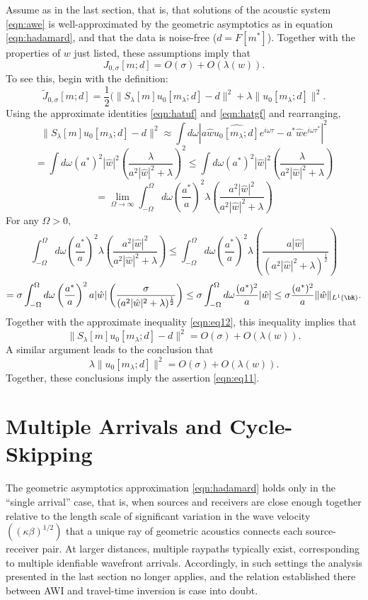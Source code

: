 Assume as in the last section, that is, that solutions
of the acoustic system \ref{eqn:awe} is well-approximated by the
geometric asymptotics as in equation \ref{eqn:hadamard}, and that the
data is noise-free ($d=F[m^*]$). Together with the properties of $w$
just listed, these assumptions imply that
\begin{equation}
  \label{eqn:eq11}
  J_{0,\sigma}[m;d] = O(\sigma) + O(\lambda(w)).
\end{equation}
To see this, begin with the definition:
\[
  \tilde{J}_{0,\sigma}[m;d] = \frac{1}{2}
  (\|S_{\lambda}[m]u_0[m_{\lambda};d]-d\|^2 + \lambda \|u_0[m_{\lambda};d]\|^2.
\]
Using the approximate identities \ref{eqn:hatuf} and \ref{eqn:hatgf} and
rearranging,
\[
\|S_{\lambda}[m]u_0[m_{\lambda};d]-d\|^2 
  \approx \int d\omega
  |a\hat{w}\hat{u_0[m_{\lambda};d]}e^{i\omega\tau}-a^*\hat{w}e^{i\omega\tau^*}|^2
\]
\[
  = \int d\omega
  (a^*)^2|\hat{w}|^2\left(\frac{\lambda}{a^2|\hat{w}|^2 +
      \lambda}\right)^2   
\le \int d\omega (a^*)^2|\hat{w}|^2
  \left(\frac{\lambda}{a^2|\hat{w}|^2 + \lambda}\right)
\]
\begin{equation}
  \label{eqn:eq12}
  = \lim_{\Omega \rightarrow \infty} \int_{-\Omega}^{\Omega} d\omega \left(\frac{a^*}{a}\right)^2\lambda
  \left(\frac{a^2|\hat{w}|^2}{a^2|\hat{w}|^2 + \lambda}\right)
\end{equation}
For any $\Omega > 0$,
\[
\int_{-\Omega}^{\Omega} d\omega \left(\frac{a^*}{a}\right)^2\lambda\left(\frac{a^2|\hat{w}|^2}{a^2|\hat{w}|^2 + \lambda}\right)
\le \int_{-\Omega}^{\Omega} d\omega \left(\frac{a^*}{a}\right)^2 \lambda
  \left(\frac{ a|\hat{w}|}{(a^2|\hat{w}|^2 +
      \lambda)^{\frac{1}{2}}}\right)
\]
\[
  = \sigma \int_{-\Omega}^{\Omega} d\omega \left(\frac{a^*}{a}\right)^2 a|\hat{w}|
  \left(\frac{\sigma }{(a^2|\hat{w}|^2 +\lambda)^{\frac{1}{2}}}\right)
  \le \sigma \int_{-\Omega}^{\Omega} d\omega \frac{(a^*)^2}{a}
  |\hat{w}|
  \le \sigma \frac{(a^*)^2}{a} \|\hat{w}\|_{L^1(\bR)}.
\]
Together with the approximate inequality \ref{eqn:eq12}, this
inequality implies
that
\[
  \|S_{\lambda}[m]u_0[m_{\lambda};d] - d\|^2 = O(\sigma) + O(\lambda(w)).
\]
A similar argument leads to the conclusion that
\[
  \lambda\|u_0[m_{\lambda};d]\|^2 = O(\sigma) + O(\lambda(w)).
\]
Together, these conclusions imply the assertion \ref{eqn:eq11}.


\section{Multiple Arrivals and Cycle-Skipping}
The geometric asymptotics approximation \ref{eqn:hadamard} holds only
in the ``single arrival'' case, that is, when sources and receivers
are close enough together relative to the length scale of significant
variation in the wave velocity $((\kappa\beta)^{1/2})$ that a unique ray of
geometric acoustics connects each source-receiver pair. At larger
distances, multiple raypaths typically exist, corresponding to
multiple idenfiable wavefront arrivals. Accordingly, in such settings
the analysis presented in the last section no longer applies, and the
relation established there between AWI and travel-time inversion is
case into doubt.

